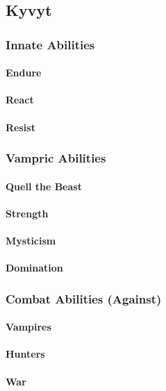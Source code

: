 \documentclass[a4paper, 12pt, finnish]{article}
\begin{document}
{	\subsection{Kyvyt}
		\subsubsection{Innate Abilities}
			\paragraph{Endure}
			\paragraph{React}
			\paragraph{Resist}
		\subsubsection{Vampric Abilities}
			\paragraph{Quell the Beast}
			\paragraph{Strength}
			\paragraph{Mysticism}
			\paragraph{Domination}
		\subsubsection{Combat Abilities (Against)}
			\paragraph{Vampires}
			\paragraph{Hunters}
			\paragraph{War}
}
\end{document}
